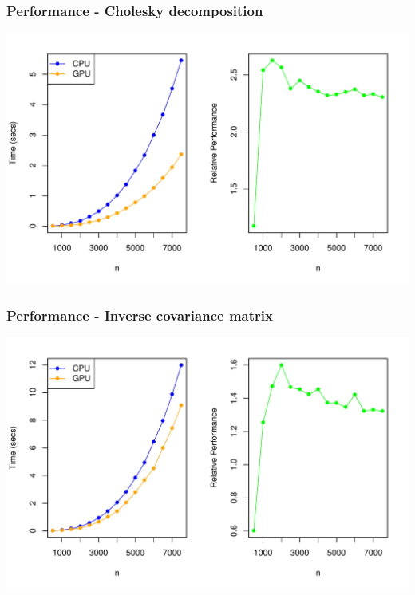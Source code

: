 \documentclass[slidestop,mathserif]{beamer}
\begin{document}

\begin{frame}
\frametitle{Performance - Cholesky decomposition}

\begin{center}
\includegraphics[width=\textwidth]{figs/chol_cov_bench.pdf}
\end{center}

\end{frame}


\begin{frame}
\frametitle{Performance - Inverse covariance matrix}

\begin{center}
\includegraphics[width=\textwidth]{figs/inv_cov_bench.pdf}
\end{center}

\end{frame}
\end{document}
